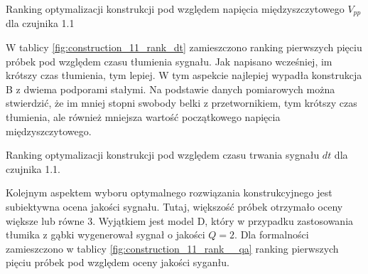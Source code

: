 \begin{table}[h]
    \caption{Ranking optymalizacji konstrukcji pod względem napięcia 
    międzyszczytowego $V_{pp}$ dla czujnika 1.1}
    \label{fig:construction_11_rank_vpp}

    \centering
\end{table}

\indent W tablicy \ref{fig:construction_11_rank_dt} zamieszczono ranking pierwszych
pięciu próbek pod względem czasu tłumienia sygnału. Jak napisano wcześniej, im krótszy
czas tłumienia, tym lepiej. W tym aspekcie najlepiej wypadła konstrukcja B z dwiema
podporami stałymi. Na podstawie danych pomiarowych można stwierdzić, że im mniej
stopni swobody belki z przetwornikiem, tym krótszy czas tłumienia, ale również mniejsza
wartość początkowego napięcia międzyszczytowego.

\begin{table}[h]
    \caption{Ranking optymalizacji konstrukcji pod względem czasu trwania 
    sygnału $dt$ dla czujnika 1.1.}
    \label{fig:construction_11_rank_dt}
  
    \centering
\end{table}

\indent Kolejnym aspektem wyboru optymalnego rozwiązania konstrukcyjnego jest subiektywna
ocena jakości sygnału. Tutaj, większość próbek otrzymało oceny większe lub równe 3. Wyjątkiem
jest model D, który w przypadku zastosowania tłumika z gąbki wygenerował sygnał o jakości $Q = 2$.
Dla formalności zamieszczono w tablicy \ref{fig:construction_11_rank__qa} ranking pierwszych 
pięciu próbek pod względem oceny jakości syganłu.
  
